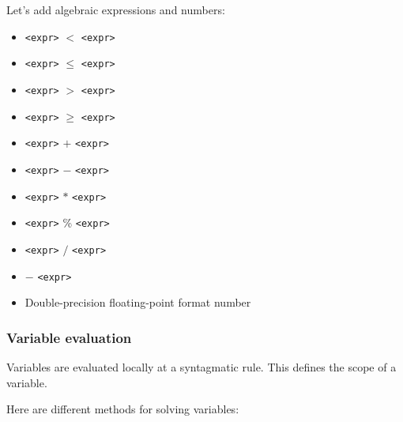 \documentclass[11pt]{article}
\begin{document}
\begin{itemize}
Let's add algebraic expressions and numbers:
    
    \begin{itemize}
    \item \verb#<expr>#  $<$ \verb#<expr>#
    \item \verb#<expr>#  $\le$ \verb#<expr>#
    \item \verb#<expr>#  $>$ \verb#<expr>#
    \item \verb#<expr>#  $\ge$ \verb#<expr>#
    \item \verb#<expr>#  $+$ \verb#<expr>#
    \item \verb#<expr>#  $-$ \verb#<expr>#
    \item \verb#<expr>#  $*$ \verb#<expr>#
    \item \verb#<expr>#  \% \verb#<expr>#
    \item \verb#<expr>#  $/$ \verb#<expr>#
    \item $-$ \verb#<expr>#
    \item Double-precision floating-point format number
    \end{itemize}
    
  \end{itemize}
  
\subsubsection*{Variable evaluation}

Variables are evaluated locally at a syntagmatic rule. This
defines the scope of a variable.

Here are different methods for solving variables:
\end{document}
